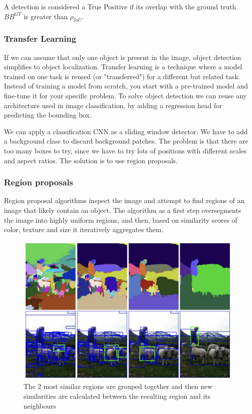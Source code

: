\documentclass{article}
\begin{document}
A detection is considered a True Positive if its overlap with the ground truth $BB^{GT}$ is greater than $\rho_{IoU}$.

\subsubsection{Transfer Learning}
If we can assume that only one object is present in the image, object detection simplifies to object localization.
Transfer learning is a technique where a model trained on one task is reused (or "transferred") for a different but related task.
Instead of training a model from scratch, you start with a pre-trained model and fine-tune it for your specific problem.
To solve object detection we can reuse any architecture used in image classification, by adding a regression head for predicting the bounding box.

We can apply a classification CNN as a sliding window detector.
We have to add a background class to discard background patches.
The problem is that there are too many boxes to try, since we have to try lots of positions with different scales and aspect ratios.
The solution is to use region proposals.

\subsubsection{Region proposals}
Region proposal algorithms inspect the image and attempt to find regions of an image that likely contain an object.
The algorithm as a first step oversegments the image into highly uniform regions, and then, based on similarity scores of color, texture and size it iteratively aggregates them.

\begin{figure}[htbp]
  \centering
  \includegraphics[width=0.6\linewidth]{./img/region_proposal.jpg}
  \caption{The 2 most similar regions are grouped together and then new similarities are calculated between the resulting region and its neighbours}
\end{figure}
\end{document}
